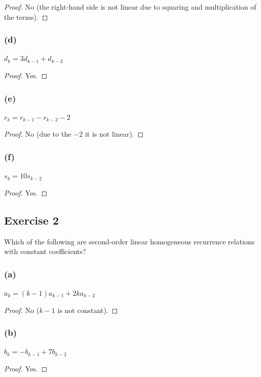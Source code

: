 \documentclass[14pt]{extarticle}
\begin{document}
\begin{proof}
No (the right-hand side is not linear due to squaring and multiplication of the terms).
\end{proof}

\subsubsection{(d)}
\(d_k = 3d_{k-1} + d_{k-2}\)

\begin{proof}
Yes.
\end{proof}

\subsubsection{(e)}
\(r_k = r_{k-1} - r_{k-2} - 2\)

\begin{proof}
No (due to the $-2$ it is not linear).
\end{proof}

\subsubsection{(f)}
\(s_k = 10s_{k-2}\)

\begin{proof}
Yes.
\end{proof}

\subsection{Exercise 2}
Which of the following are second-order linear homogeneous recurrence relations with constant coefficients?

\subsubsection{(a)}
\(a_k = (k-1)a_{k-1} + 2ka_{k-2}\)

\begin{proof}
No ($k-1$ is not constant).
\end{proof}

\subsubsection{(b)}
\(b_k = -b_{k-1} + 7b_{k-2}\)

\begin{proof}
Yes.
\end{proof}
\end{document}
